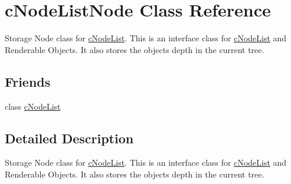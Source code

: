 \hypertarget{classc_node_list_node}{
\section{cNodeListNode Class Reference}
\label{classc_node_list_node}
}


Storage Node class for \hyperlink{classc_node_list}{cNodeList}. This is an interface class for \hyperlink{classc_node_list}{cNodeList} and Renderable Objects. It also stores the objects depth in the current tree.  


\subsection*{Friends}
\begin{DoxyCompactItemize}
\item 
\hypertarget{classc_node_list_node_a1f839716f414e0ddf8a3e225fb58cc44}{
class \hyperlink{classc_node_list_node_a1f839716f414e0ddf8a3e225fb58cc44}{cNodeList}}
\label{classc_node_list_node_a1f839716f414e0ddf8a3e225fb58cc44}

\end{DoxyCompactItemize}


\subsection{Detailed Description}
Storage Node class for \hyperlink{classc_node_list}{cNodeList}. This is an interface class for \hyperlink{classc_node_list}{cNodeList} and Renderable Objects. It also stores the objects depth in the current tree. 